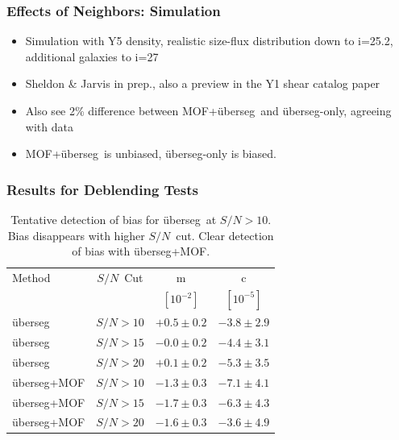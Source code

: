 \documentclass{beamer}
\newcommand{\snr}{$S/N$}
\newcommand{\uberseg}{{\"u}berseg}
\begin{document}
\frame
{

 
    \frametitle{Effects of Neighbors: Simulation}

    \begin{itemize}

        \item Simulation with Y5 density, realistic size-flux distribution down
            to i=25.2, additional galaxies to i=27

        \item Sheldon \& Jarvis in prep., also a preview in the Y1 shear catalog
            paper

        \item Also see 2\% difference between MOF+\uberseg\ and \uberseg-only,
            agreeing with data

        \item MOF+\uberseg\ is unbiased, \uberseg-only is biased.

    \end{itemize}
}



\frame
{

    \frametitle{Results for Deblending Tests}

\begin{table}
    \centering
    \begin{tabular}{|l|c|c|c|}
        \hline
        Method         & \snr\ Cut & m            & c            \\
                       &           & $[10^{-2}]$  & $[10^{-5}]$  \\
        \hline

		\hline
        \uberseg       & \snr$ > 10$ & $+0.5 \pm 0.2$  & $-3.8 \pm 2.9$ \\
        \uberseg       & \snr$ > 15$ & $-0.0 \pm 0.2$  & $-4.4 \pm 3.1$ \\
        \uberseg       & \snr$ > 20$ & $+0.1 \pm 0.2$  & $-5.3 \pm 3.5$ \\

        \hline
        \uberseg+MOF   & \snr$ > 10$ & $-1.3 \pm 0.3$ & $-7.1 \pm 4.1$ \\
        \uberseg+MOF   & \snr$ > 15$ & $-1.7 \pm 0.3$ & $-6.3 \pm 4.3$ \\
        \uberseg+MOF   & \snr$ > 20$ & $-1.6 \pm 0.3$ & $-3.6 \pm 4.9$ \\


		\hline
    \end{tabular}
    \caption{Tentative detection of bias for \uberseg\ at \snr$>10$.
    Bias disappears with higher \snr\ cut.
    Clear detection of bias with \uberseg+MOF.
     \label{tab:mcal:deblending}}
\end{table}


}
\end{document}
